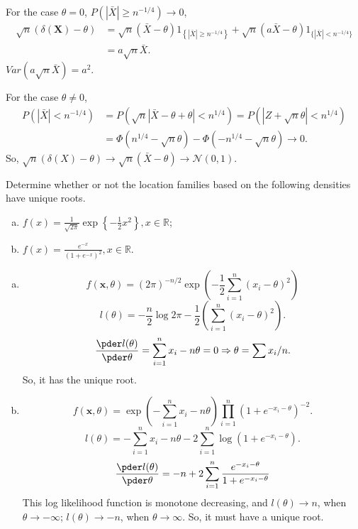 \begin{solution}
    For the case $\theta=0$, $P(|\bar{X}|\geqslant n^{-1/4})\to 0$, 
    \begin{align*}
        \sqrt{n}(\delta(\mathbf{X})-\theta)&=\sqrt{n}(\bar{X}-\theta) 1_{\left\{|\bar{X}| \geq n^{-1 / 4}\right\}}+\sqrt{n}(a\bar{X}-\theta) 1_{\{|\bar{X}|<n^{-1/4}\}}\\
        &=a\sqrt{n}\bar{X}. 
    \end{align*}
    $Var(a\sqrt{n}\bar{X})=a^2. $

    \noindent For the case $\theta\neq 0$, 
    \[
        \begin{aligned}
            P(|\bar{X}|<n^{-1/4})&=P(\sqrt{n}|\bar{X}-\theta+\theta|<n^{1/4})=P(|Z+\sqrt{n}\theta|<n^{1/4})\\
            &=\Phi(n^{1/4}-\sqrt{n}\theta)-\Phi(-n^{1/4}-\sqrt{n}\theta)\to 0. 
        \end{aligned}
    \]
    So, $\sqrt{n}(\delta(X)-\theta)\to \sqrt{n}(\bar{X}-\theta)\to \mathcal{N}(0,1)$. 
\end{solution}



\begin{ex}
    \label{ex:7.2}
    Determine whether or not the location families based on the following densities have unique roots. 
    \begin{enumerate}[(a)]
        \item \label{ex:7.2.a} \(f(x)=\frac{1}{\sqrt{2 \pi}} \exp \left\{-\frac{1}{2} x^{2}\right\}, x \in \mathbb{R}\); 
        \item \(f(x)=\frac{e^{-x}}{\left(1+e^{-x}\right)^{2}}, x \in \mathbb{R}\). 
    \end{enumerate}
\end{ex}

\begin{solution}
    \begin{enumerate}[(a)]
        \item \[
            f(\mathbf{x}, \theta)=(2\pi)^{-n/2} \exp\left(-\frac{1}{2}\sum_{i=1}^n(x_i-\theta)^2\right)
        \]
        \[
            l(\theta)=-\frac{n}{2}\log 2\pi-\frac{1}{2}\left(\sum_{i=1}^n(x_i-\theta)^2\right). 
        \]
        \[
            \frac{\pder l(\theta)}{\pder \theta}=\sum_{i=1}^nx_i-n\theta=0\Rightarrow \theta=\sum x_i/n. 
        \]
        So, it has the unique root. 
        \item \[
            f(\mathbf{x}, \theta)=\exp\left(-\sum_{i=1}^n x_i-n\theta\right)\prod_{i=1}^n(1+e^{-x_i-\theta})^{-2}. 
        \]
        \[
            l(\theta)=-\sum_{i=1}^n x_i-n\theta-2\sum_{i=1}^n\log(1+e^{-x_i-\theta}). 
        \]
        \[
            \frac{\pder l(\theta)}{\pder \theta}=-n+2\sum_{i=1}^n\frac{e^{-x_i-\theta}}{1+e^{-x_i-\theta}}
        \]
        This log likelihood function is monotone decreasing, and $l(\theta)\to n$, when $\theta\to-\infty$; $l(\theta)\to -n$, when $\theta\to\infty$. So, it must have a unique root. 
    \end{enumerate}
\end{solution}

